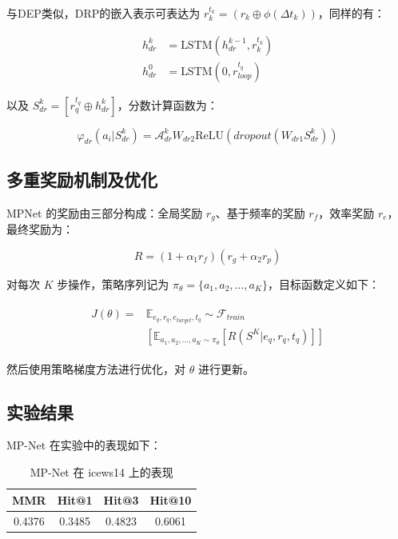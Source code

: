 \documentclass[a4paper, AutoFakeBold]{article}
\begin{document}
与DEP类似，DRP的嵌入表示可表达为 $r_k^{t_k}=(r_k\oplus\phi(\Delta t_k))$，同样的有：

\begin{equation}
	\begin{aligned}
h^k_{dr} & =\text{LSTM}(h_{dr}^{k-1},r_k^{t_k}) \\ 
h^0_{dr} & =\text{LSTM}(0,r_{loop}^{t_q})
	\end{aligned}
\end{equation}

以及 $S_{dr}^k=[r_q^{t_q}\oplus h^k_{dr}]$，分数计算函数为：

\begin{equation}
\varphi_{dr}(a_i|S^k_{dr})={\mathcal A}_{dr}^k W_{dr2}\text{ReLU}(dropout(W_{dr1}S^k_{dr}))
\end{equation}


\subsection{多重奖励机制及优化}

MPNet 的奖励由三部分构成：全局奖励 $r_g$、基于频率的奖励 $r_f$，效率奖励 $r_e$，最终奖励为：

\begin{equation}
R=(1+\alpha_1 r_f)(r_g+\alpha_2 r_p)
\end{equation}

对每次 $K$ 步操作，策略序列记为 $\pi_{\theta}=\{a_1,a_2,\dots,a_K\}$，目标函数定义如下：

\begin{equation}
\begin{aligned}
	\begin{split}
		J(\theta)= & {\mathbb E}_{e_q,r_q,e_{target},t_q}\sim{\mathcal F}_{train}\\
		& [{\mathbb E}_{a_1,a_2,\dots,a_K\sim\pi_{\theta}}[R(S^K|e_q,r_q,t_q)]]
	\end{split}
\end{aligned}
\end{equation}

然后使用策略梯度方法进行优化，对 $\theta$ 进行更新。

\subsection{实验结果}

MP-Net 在实验中的表现如下：




\begin{table}[htbp]
	\centering
	\caption{MP-Net 在 icews14 上的表现}
	\begin{tabular}{cccc}
		\toprule  %
		MMR&Hit@1&Hit@3&Hit@10 \\ 
		\midrule  %
		0.4376&0.3485&0.4823&0.6061 \\
		\bottomrule  %
	\end{tabular}
\end{table}
\end{document}
